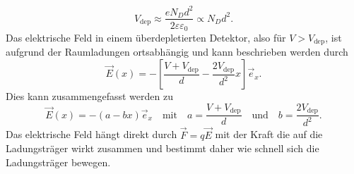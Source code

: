 \begin{equation}
    V_{\text{dep}} \approx \frac{e N_D d^2}{2 \varepsilon \varepsilon_0} \propto N_D d^2.
    \label{eqn:V_dep}
\end{equation}
Das elektrische Feld in einem überdepletierten Detektor, also für $V > V_{\text{dep}}$, ist aufgrund der Raumladungen ortsabhängig und kann beschrieben werden durch
\begin{equation*}
    \vec{E}\left(x\right) = - \left[\frac{V+V_{\text{dep}}}{d}-\frac{2 V_{\text{dep}}}{d^2}x\right] \vec{e}_x.
    \label{eqn:E}
\end{equation*}
Dies kann zusammengefasst werden zu
\begin{equation}
    \vec{E}\left(x\right) = - \left(a-b x\right) \vec{e}_x \quad \text{mit} \quad a =\frac{V+V_{\text{dep}}}{d} \quad \text{und} \quad b= \frac{2 V_{\text{dep}}}{d^2}.
    \label{eqn:E_neu}
\end{equation}
Das elektrische Feld hängt direkt durch $\vec{F} = q \vec{E}$ mit der Kraft die auf die Ladungsträger wirkt zusammen und bestimmt daher wie schnell sich die Ladungsträger bewegen.
